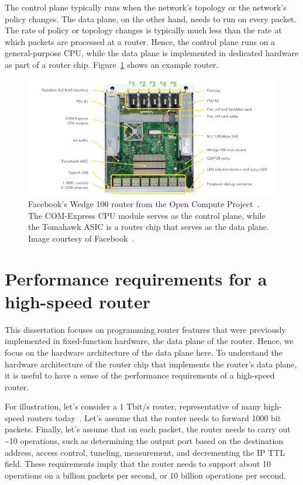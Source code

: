The control plane typically runs when the network's topology or the network's
policy changes. The data plane, on the other hand, needs to run on every
packet. The rate of policy or topology changes is typically much less than the
rate at which packets are processed at a router. Hence, the control plane runs
on a general-purpose CPU, while the data plane is implemented in dedicated
hardware as part of a router chip.  Figure~\ref{fig:router_box} shows
an example router.

\begin{figure}
\centering
\includegraphics[width=\textwidth]{wedge100.png}
\caption{Facebook's Wedge 100 router from the Open Compute Project~\cite{ocp}.
The COM-Express CPU module serves as the control plane, while the Tomahawk ASIC
is a router chip that serves as the data plane. Image courtesy of
Facebook~\cite{wedge100}.}
\label{fig:router_box}
\end{figure}

\section{Performance requirements for a high-speed router}
This dissertation focuses on programming router features that were previously
implemented in fixed-function hardware, \ie the data plane of the router.
Hence, we focus on the hardware architecture of the data plane here.  To
understand the hardware architecture of the router chip that implements the
router's data plane, it is useful to have a sense of the performance
requirements of a high-speed router.

For illustration, let's consider a 1 Tbit/s router, representative of many
high-speed routers today~\cite{trident2, tomahawk, tomahawk2}. Let's assume
that the router needs to forward 1000 bit packets. Finally, let's assume that
on each packet, the router needs to carry out \textasciitilde10 operations,
such as determining the output port based on the destination address, access
control, tuneling, measurement, and decrementing the IP TTL field. These
requirements imply that the router needs to support about 10 operations on a
billion packets per second, or 10 billion operations per second.

